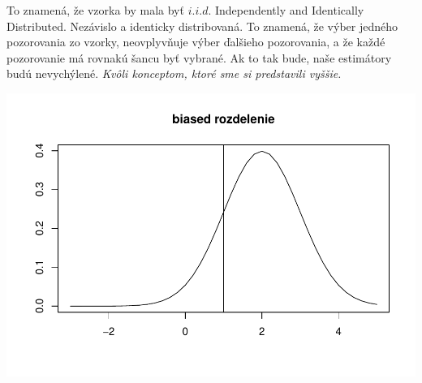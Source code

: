 To znamená, že vzorka by mala byť \(i.i.d\). Independently and
Identically Distributed. Nezávislo a identicky distribovaná. To znamená,
že výber jedného pozorovania zo vzorky, neovplyvňuje výber ďalšieho
pozorovania, a že každé pozorovanie má rovnakú šancu byť vybrané. Ak to
tak bude, naše estimátory budú nevychýlené. \emph{Kvôli konceptom, ktoré
sme si predstavili vyššie.}

\begin{Shaded}
\begin{Highlighting}[]

\StringTok{ }\NormalTok{(} \NormalTok{, } \NormalTok{, } \NormalTok{)}



\NormalTok{(}  \NormalTok{, } \NormalTok{), } \NormalTok{,}
      \NormalTok{, } \NormalTok{, } \NormalTok{)}

\NormalTok{(} \NormalTok{)}
\end{Highlighting}
\end{Shaded}

\includegraphics{test_files/figure-latex/unnamed-chunk-45-1.pdf}

